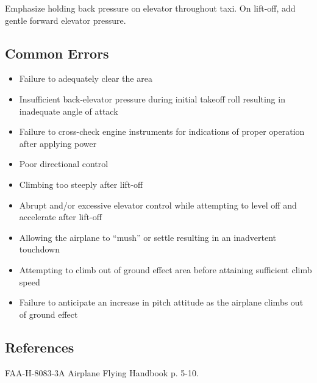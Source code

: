 Emphasize holding back pressure on elevator throughout taxi. On lift-off, add
gentle forward elevator pressure.

\subsection{Common Errors}

\begin{itemize}
  \item Failure to adequately clear the area
  \item Insufficient back-elevator pressure during initial takeoff roll
    resulting in inadequate angle of attack
  \item Failure to cross-check engine instruments for indications of proper
    operation after applying power
  \item Poor directional control
  \item Climbing too steeply after lift-off
  \item Abrupt and/or excessive elevator control while attempting to level off
    and accelerate after lift-off
  \item Allowing the airplane to ``mush'' or settle resulting in an inadvertent
    touchdown
  \item Attempting to climb out of ground effect area before attaining
    sufficient climb speed
  \item Failure to anticipate an increase in pitch attitude as the airplane
    climbs out of ground effect
\end{itemize}

\subsection{References}

FAA-H-8083-3A Airplane Flying Handbook p. 5-10.

